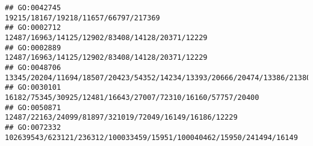 \documentclass[
]{article}
\begin{document}
\begin{verbatim}
## GO:0042745                                                                                                                                                                                                                                                                                                                                                                         19215/18167/19218/11657/66797/217369
## GO:0002712                                                                                                                                                                                                                                                                                                                                                              12487/16963/14125/12902/83408/14128/20371/12229
## GO:0002889                                                                                                                                                                                                                                                                                                                                                              12487/16963/14125/12902/83408/14128/20371/12229
## GO:0048706                                                                                                                                                                                                                                                                                                                                      13345/20204/11694/18507/20423/54352/14234/13393/20666/20474/13386/21380
## GO:0030101                                                                                                                                                                                                                                                                                                                                                  16182/75345/30925/12481/16643/27007/72310/16160/57757/20400
## GO:0050871                                                                                                                                                                                                                                                                                                                                                       12487/22163/24099/81897/321019/72049/16149/16186/12229
## GO:0072332                                                                                                                                                                                                                                                                                                                                         102639543/623121/236312/100033459/15951/100040462/15950/241494/16149

\end{verbatim}
\end{document}

